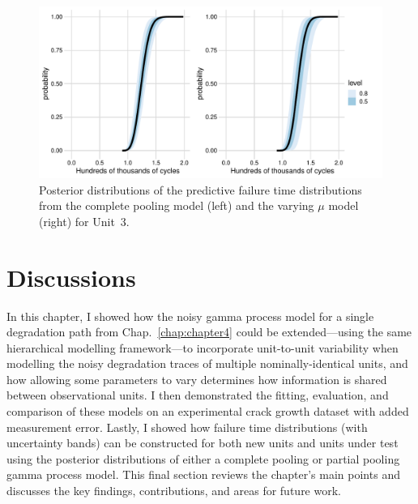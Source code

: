 \begin{figure}[h]
    \centering
    \includegraphics[width=0.95\columnwidth]{./figures/ch-5/FT_dist_Unit3.pdf}
    \caption{Posterior distributions of the predictive failure time distributions from the complete pooling model (left) and the varying $\mu$ model (right) for Unit~3.}
    \label{fig:FT_CP_VM_U3}
\end{figure}

\section{Discussions} \label{sec:unit-to-unit-discussion}

In this chapter, I showed how the noisy gamma process model for a single degradation path from Chap.~\ref{chap:chapter4} could be extended---using the same hierarchical modelling framework---to incorporate unit-to-unit variability when modelling the noisy degradation traces of multiple nominally-identical units, and how allowing some parameters to vary determines how information is shared between observational units. I then demonstrated the fitting, evaluation, and comparison of these models on an experimental crack growth dataset with added measurement error. Lastly, I showed how failure time distributions (with uncertainty bands) can be constructed for both new units and units under test using the posterior distributions of either a complete pooling or partial pooling gamma process model. This final section reviews the chapter's main points and discusses the key findings, contributions, and areas for future work.

